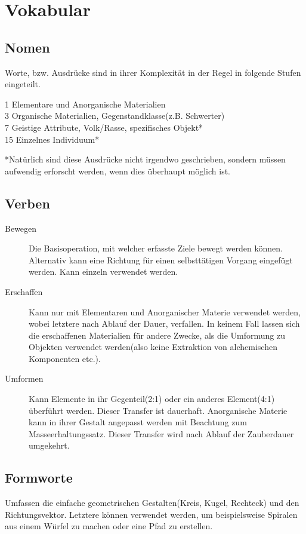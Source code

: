\documentclass[a4paper,12pt,oneside]{book}
\begin{document}
\chapter{Vokabular}

\section{Nomen}
Worte, bzw. Ausdrücke sind in ihrer Komplexität in der Regel in folgende Stufen eingeteilt.
\begin{description}
\item[1 Elementare und Anorganische Materialien]
\item[3 Organische Materialien, Gegenstandklasse(z.B. Schwerter)]
\item[7 Geistige Attribute, Volk/Rasse, spezifisches Objekt*]
\item[15 Einzelnes Individuum*]
\end{description}
*Natürlich sind diese Ausdrücke nicht irgendwo geschrieben, sondern müssen aufwendig erforscht werden, wenn dies überhaupt möglich ist.

\section{Verben}
\begin{description}
\item[Bewegen]Die Basisoperation, mit welcher erfasste Ziele bewegt werden können. Alternativ kann eine Richtung für einen selbsttätigen Vorgang eingefügt werden. Kann einzeln verwendet werden.
\item[Erschaffen]Kann nur mit Elementaren und Anorganischer Materie verwendet werden, wobei letztere nach Ablauf der Dauer, verfallen. In keinem Fall lassen sich die erschaffenen Materialien für andere Zwecke, als die Umformung zu Objekten verwendet werden(also keine Extraktion von alchemischen Komponenten etc.).
\item[Umformen]Kann Elemente in ihr Gegenteil(2:1) oder ein anderes Element(4:1) überführt werden. Dieser Transfer ist dauerhaft. Anorganische Materie kann in ihrer Gestalt angepasst werden mit Beachtung zum Masseerhaltungssatz. Dieser Transfer wird nach Ablauf der Zauberdauer umgekehrt.
\end{description}

\section{Formworte}
Umfassen die einfache geometrischen Gestalten(Kreis, Kugel, Rechteck) und den Richtungsvektor. Letztere können verwendet werden, um beispielsweise Spiralen aus einem Würfel zu machen oder eine Pfad zu erstellen. 
\end{document}
